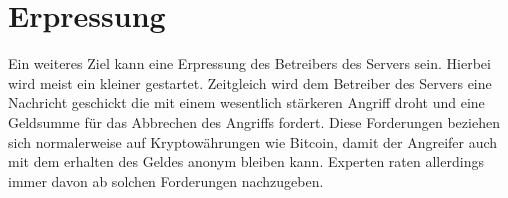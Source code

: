 \section{Erpressung}

Ein weiteres Ziel kann eine Erpressung des Betreibers des Servers sein. Hierbei wird meist ein kleiner gestartet. Zeitgleich wird dem Betreiber des Servers eine Nachricht geschickt die mit einem wesentlich stärkeren Angriff droht und eine Geldsumme für das Abbrechen des Angriffs fordert. Diese Forderungen beziehen sich normalerweise auf Kryptowährungen wie Bitcoin, damit der Angreifer auch mit dem erhalten des Geldes anonym bleiben kann. Experten raten allerdings immer davon ab solchen Forderungen nachzugeben.